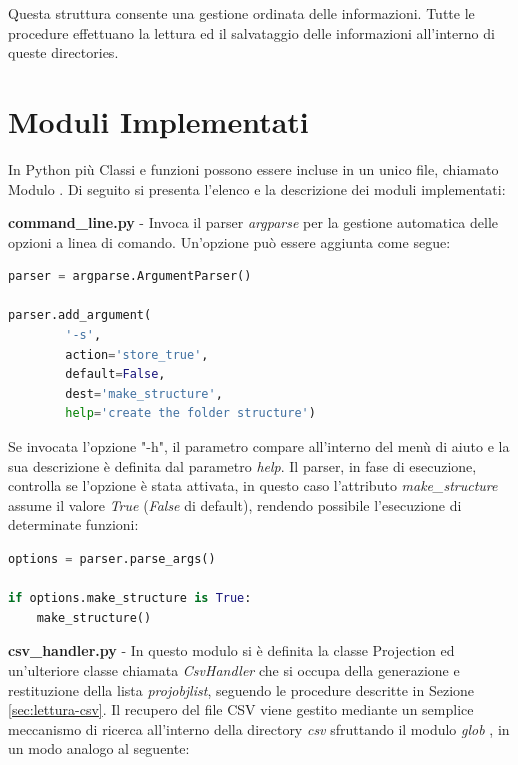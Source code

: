 \documentclass[a4paper,12pt, doubleside]{report}
\begin{document}
                Questa struttura consente una gestione ordinata delle informazioni. Tutte le procedure effettuano la lettura ed il salvataggio delle informazioni all'interno di queste directories.
                
        \section{Moduli Implementati}
            \par
                In Python più Classi e funzioni possono essere incluse in un unico file, chiamato Modulo \cite{python-modules}. Di seguito si presenta l'elenco e la descrizione dei moduli implementati:
            
            \bigskip
            \par
                \textbf{command\_line.py} - Invoca il parser \textit{argparse} per la gestione automatica delle opzioni a linea di comando. Un'opzione può essere aggiunta come segue:
                
                \begin{lstlisting}[language=python, frame=bt]
parser = argparse.ArgumentParser()

parser.add_argument(
        '-s', 
        action='store_true', 
        default=False,
        dest='make_structure',
        help='create the folder structure')
                \end{lstlisting}
                
                Se invocata l'opzione "-h", il parametro compare all'interno del menù di aiuto e la sua descrizione è definita dal parametro \textit{help}. Il parser, in fase di esecuzione, controlla se l'opzione è stata attivata, in questo caso l'attributo \textit{make\_structure} assume il valore \textit{True} (\textit{False} di default), rendendo possibile l'esecuzione di determinate funzioni:
                
                \begin{lstlisting}[language=python, frame=bt]
options = parser.parse_args()
                
if options.make_structure is True:
    make_structure()
                \end{lstlisting}
               
            \bigskip
            \par
                \textbf{csv\_handler.py} - In questo modulo si è definita la classe Projection ed un'ulteriore classe chiamata \textit{CsvHandler} che si occupa della generazione e restituzione della lista \textit{proj\textunderscore obj\textunderscore list}, seguendo le procedure descritte in Sezione \ref{sec:lettura-csv}. Il recupero del file CSV viene gestito mediante un semplice meccanismo di ricerca all'interno della directory \textit{csv} sfruttando il modulo \textit{glob} \cite{python-glob}, in un modo analogo al seguente:
                
\end{document}
